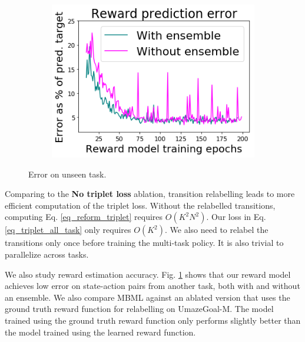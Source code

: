 \begin{figure}
    \flushright
    \vspace{-0.5em}
    \begin{subfigure}{0.259\paperwidth}
        \includegraphics[width=\linewidth]{chapter_2/fig/reward_pred_error.png}
    \end{subfigure}
    \caption{Error on unseen task.}\label{fig:reward_error}
    \vspace{-0.2em}
\end{figure}

Comparing to the \textbf{No triplet loss} ablation, transition relabelling leads to more efficient computation of the triplet loss. Without the relabelled transitions, computing Eq. \ref{eq_reform_triplet} requires $O(K^2 N^2)$. Our loss in Eq. \ref{eq_triplet_all_task} only requires $O(K^2)$. We also need to relabel the transitions only once before training the multi-task policy. It is also trivial to parallelize across tasks.

We also study reward estimation accuracy. Fig. \ref{fig:reward_error} shows that our reward model achieves low error on state-action pairs from another task, both with and without an ensemble. We also compare MBML against an ablated version that uses the ground truth reward function for relabelling on UmazeGoal-M. The model trained using the ground truth reward function only performs slightly better than the model trained using the learned reward function. 

